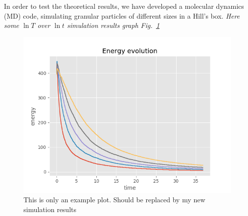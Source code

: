 \documentclass[11pt, notitlepage]{article} %
\begin{document}
In order to test the theoretical results, we have developed a molecular dynamics (MD) 
code, simulating granular particles of different sizes in a Hill's box. 
\emph{Here some $\ln T$ over $\ln t$ simulation results graph Fig.~\ref{fig2}}
\begin{figure}[h] %
	\centering
	\includegraphics[scale = .80]{Figures/energy_evo.png}
	\caption{\footnotesize This is only an example plot. Should be replaced by my new simulation results}
	\label{fig2}
\end{figure}
\end{document}
